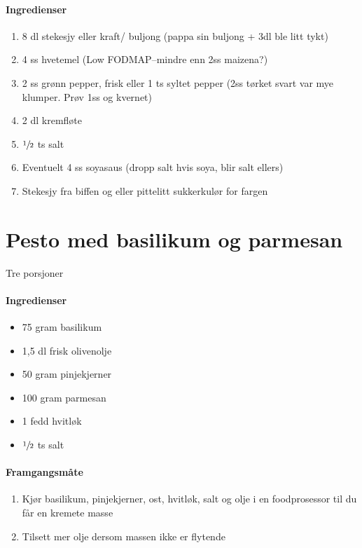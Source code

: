 \documentclass[12pt,a4paper]{book}
\begin{document}
\paragraph{Ingredienser}
\begin{enumerate}[noitemsep]
	\item 8 dl stekesjy eller kraft/ buljong (pappa sin buljong + 3dl ble litt tykt)
	\item 4 ss hvetemel (Low FODMAP--mindre enn 2ss maizena?)
	\item 2 ss grønn pepper, frisk eller 1 ts syltet pepper (2ss tørket svart var mye klumper.  Prøv 1ss og kvernet)
	\item 2 dl kremfløte
	\item  $\sfrac{1}{2}$  ts salt
	\item Eventuelt 4 ss soyasaus (dropp salt hvis soya, blir salt ellers)
	\item Stekesjy fra biffen og eller pittelitt sukkerkulør for fargen
\end{enumerate}
\clearpage{}
\clearpage{}\section{﻿Pesto med basilikum og parmesan}
Tre porsjoner

\paragraph{Ingredienser}
\begin{itemize}[noitemsep]
	\item 75 gram basilikum
	\item 1,5 dl frisk olivenolje
	\item 50 gram pinjekjerner
	\item 100 gram parmesan
	\item 1 fedd hvitløk
	\item $\sfrac{1}{2}$ ts salt
\end{itemize}

\paragraph{Framgangsmåte}
\begin{enumerate}[noitemsep]
	\item Kjør basilikum, pinjekjerner, ost, hvitløk, salt og olje i en foodprosessor til du får en kremete masse
	\item Tilsett mer olje dersom massen ikke er flytende
\end{enumerate}
\end{document}
